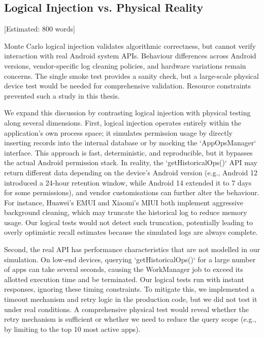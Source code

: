 \subsection{Logical Injection vs. Physical Reality} [Estimated: 800 words]

Monte Carlo logical injection validates algorithmic correctness, but cannot verify interaction with real Android system APIs. Behaviour differences across Android versions, vendor-specific log cleaning policies, and hardware variations remain concerns. The single smoke test provides a sanity check, but a large-scale physical device test would be needed for comprehensive validation. Resource constraints prevented such a study in this thesis.

We expand this discussion by contrasting logical injection with physical testing along several dimensions. First, logical injection operates entirely within the application's own process space; it simulates permission usage by directly inserting records into the internal database or by mocking the `AppOpsManager` interface. This approach is fast, deterministic, and reproducible, but it bypasses the actual Android permission stack. In reality, the `getHistoricalOps()` API may return different data depending on the device's Android version (e.g., Android 12 introduced a 24‑hour retention window, while Android 14 extended it to 7 days for some permissions), and vendor customisations can further alter the behaviour. For instance, Huawei's EMUI and Xiaomi's MIUI both implement aggressive background cleaning, which may truncate the historical log to reduce memory usage. Our logical tests would not detect such truncation, potentially leading to overly optimistic recall estimates because the simulated logs are always complete.

Second, the real API has performance characteristics that are not modelled in our simulation. On low‑end devices, querying `getHistoricalOps()` for a large number of apps can take several seconds, causing the WorkManager job to exceed its allotted execution time and be terminated. Our logical tests run with instant responses, ignoring these timing constraints. To mitigate this, we implemented a timeout mechanism and retry logic in the production code, but we did not test it under real conditions. A comprehensive physical test would reveal whether the retry mechanism is sufficient or whether we need to reduce the query scope (e.g., by limiting to the top 10 most active apps).

